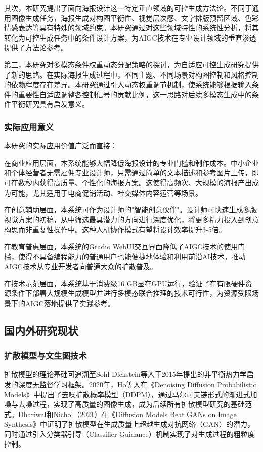 \documentclass[12pt,a4paper]{ctexart}
\begin{document}
其次，本研究提出了面向海报设计这一特定垂直领域的可控生成方法论。不同于通用图像生成任务，海报生成对构图平衡性、视觉层次感、文字排版预留区域、色彩情感表达等具有特殊的领域约束。本研究通过对这些领域特性的系统性分析，将其转化为可控生成任务中的条件设计方案，为AIGC技术在专业设计领域的垂直渗透提供了方法论参考。

第三，本研究对多模态条件权重动态分配策略的探讨，为自适应可控生成研究提供了新的思路。在实际海报生成过程中，不同主题、不同场景对构图控制和风格控制的依赖程度存在差异。本研究通过引入动态权重调节机制，使系统能够根据输入条件的重要性自适应调整各控制信号的贡献比例，这一思路对后续多模态生成中的条件平衡研究具有启发意义。

\subsubsection{实际应用意义}

本研究的实际应用价值广泛而直接：

在商业应用层面，本系统能够大幅降低海报设计的专业门槛和制作成本。中小企业和个体经营者无需雇佣专业设计师，只需通过简单的文本描述和参考图片上传，即可在数秒内获得高质量、个性化的海报方案。这使得高频次、大规模的海报产出成为可能，尤其适用于电商促销活动、社交媒体内容运营等场景。

在创意辅助层面，本系统可作为设计师的"智能创意伙伴"。设计师可快速生成多版视觉方案的初稿，从中筛选最具潜力的方向进行深度优化，将更多精力投入到创意构思而非重复性操作中。这种人机协作模式有望将设计效率提升3-5倍。

在教育普惠层面，本系统的Gradio WebUI交互界面降低了AIGC技术的使用门槛，使得不具备编程能力的普通用户也能便捷地体验和利用前沿AI技术，推动AIGC技术从专业开发者向普通大众的扩散普及。

在技术示范层面，本系统基于消费级16 GB显存GPU运行，验证了在有限硬件资源条件下部署大规模生成模型并进行多模态联合推理的技术可行性，为资源受限场景下的AIGC落地提供了实践参考。

\subsection{国内外研究现状}

\subsubsection{扩散模型与文生图技术}

扩散模型的理论基础可追溯至Sohl-Dickstein等人于2015年提出的非平衡热力学启发的深度无监督学习框架。2020年，Ho等人在《Denoising Diffusion Probabilistic Models》中提出了去噪扩散概率模型（DDPM），通过马尔可夫链形式的渐进式加噪与去噪过程，实现了高质量的图像生成，成为后续所有扩散模型研究的基础范式。Dhariwal和Nichol（2021）在《Diffusion Models Beat GANs on Image Synthesis》中证明了扩散模型在生成质量上超越生成对抗网络（GAN）的潜力，同时通过引入分类器引导（Classifier Guidance）机制实现了对生成过程的粗粒度控制。
\end{document}

